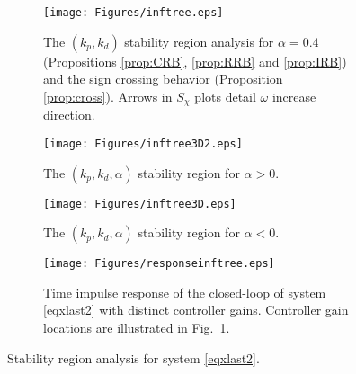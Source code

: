 \documentclass[twoside,reqno,11pt]{fcaa-var} %
\begin{document}
\begin{figure}%
	\centering %
	\begin{subfigure}[b]{0.48\columnwidth}
		\centering
		\texttt{[image: Figures/inftree.eps]}
		\caption{The $(k_p,k_d)$ stability region analysis for $\alpha=0.4$ (Propositions \ref{prop:CRB}, \ref{prop:RRB} and \ref{prop:IRB}) and  the sign crossing behavior (Proposition \ref{prop:cross}). Arrows in $S_\chi$ plots detail $\omega$ increase direction.}\label{inftreeregiona}
	\end{subfigure}
	\hfill
	\begin{subfigure}[b]{0.48\columnwidth}
		\centering
		\texttt{[image: Figures/inftree3D2.eps]}
		\caption{The $(k_p,k_d,\alpha)$ stability region for $\alpha>0$.}
		\label{inftreeregionc}
	\end{subfigure}
	\hfill

\begin{subfigure}[b]{0.48\columnwidth}
	\centering
	\texttt{[image: Figures/inftree3D.eps]}
	\caption{The $(k_p,k_d,\alpha)$ stability region for $\alpha<0$.}
	\label{inftreeregionb}
\end{subfigure}
	\hfill
\begin{subfigure}[b]{0.48\columnwidth}
	\centering
	\texttt{[image: Figures/responseinftree.eps]}
	\caption{Time impulse response of the closed-loop of system \eqref{eqxlast2} with distinct controller gains. Controller gain locations are illustrated in Fig.~\ref{inftreeregiona}.}
	\label{Responseinftr}
\end{subfigure}
	\caption{Stability region analysis for system \eqref{eqxlast2}.}\label{inftreeregion}
\end{figure}
\end{document}

